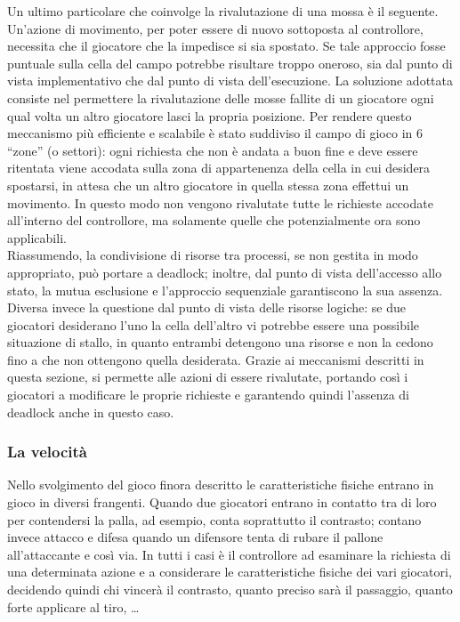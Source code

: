 Un ultimo particolare che coinvolge la rivalutazione di una mossa è il seguente. Un'azione di movimento, per poter essere di nuovo sottoposta al controllore, necessita che il giocatore che la impedisce si sia spostato. Se tale approccio fosse puntuale sulla cella del campo potrebbe risultare troppo oneroso, sia dal punto di vista implementativo che dal punto di vista dell'esecuzione. La soluzione adottata consiste nel permettere la rivalutazione delle mosse fallite di un giocatore ogni qual volta un altro giocatore lasci la propria posizione. Per rendere questo meccanismo più efficiente e scalabile è stato suddiviso il campo di gioco in 6 ``zone'' (o settori): ogni richiesta che non è andata a buon fine e deve essere ritentata viene accodata sulla zona di appartenenza della cella in cui desidera spostarsi, in attesa che un altro giocatore in quella stessa zona effettui un movimento. In questo modo non vengono rivalutate tutte le richieste accodate all'interno del controllore, ma solamente quelle che potenzialmente ora sono applicabili.\\

Riassumendo, la condivisione di risorse tra processi, se non gestita in modo appropriato, può portare a deadlock; inoltre, dal punto di vista dell'accesso allo stato, la mutua esclusione e l'approccio sequenziale garantiscono la sua assenza. Diversa invece la questione dal punto di vista delle risorse logiche: se due giocatori desiderano l'uno la cella dell'altro vi potrebbe essere una possibile situazione di stallo, in quanto entrambi detengono una risorse e non la cedono fino a che non ottengono quella desiderata. Grazie ai meccanismi descritti in questa sezione, si permette alle azioni di essere rivalutate, portando così i giocatori a modificare le proprie richieste e garantendo quindi l'assenza di deadlock anche in questo caso.

\subsubsection{La velocità}
\label{sec:analisi_concorrenza_velocita}

Nello svolgimento del gioco finora descritto le caratteristiche fisiche entrano in gioco in diversi frangenti. Quando due giocatori entrano in contatto tra di loro per contendersi la palla, ad esempio, conta soprattutto il contrasto; contano invece attacco e difesa quando un difensore tenta di rubare il pallone all'attaccante e così via. In tutti i casi è il controllore ad esaminare la richiesta di una determinata azione e a considerare le caratteristiche fisiche dei vari giocatori, decidendo quindi chi vincerà il contrasto, quanto preciso sarà il passaggio, quanto forte applicare al tiro, \ldots\\

